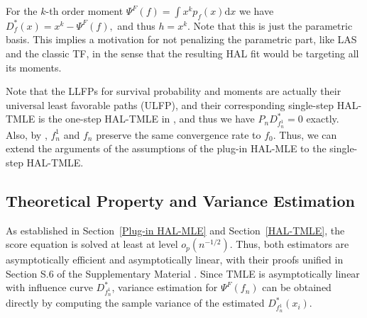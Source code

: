 \begin{example}
For the $k$-th order moment $\Psi^F(f)=\int x^k p_f(x)\mathrm{d}x$ we have
\(D^*_f(x) = x^k - \Psi^F(f),\) and thus $h = x^k$. Note that this is just the parametric basis. This implies a motivation for not penalizing the parametric part, like LAS and the classic TF, in the sense that the resulting HAL fit would be targeting all its moments.
\end{example}
Note that the LLFPs for survival probability and moments are actually their universal least favorable paths (ULFP), and their corresponding single-step HAL-TMLE is the one-step HAL-TMLE in \citet{van2017generally, van2016one, van2018targeted}, and thus we have $P_n D^*_{f_n^1} = 0$ exactly. Also, by \citet{van2017generally}, $f_n^1$ and $f_n$ preserve the same convergence rate to $f_0$. Thus, we can extend the arguments of the assumptions of the plug-in HAL-MLE to the single-step HAL-TMLE. 

\subsection{Theoretical Property and Variance Estimation}
\label{subsec: EIC-based-variance-estimation}
As established in Section~\ref{Plug-in HAL-MLE} and Section~\ref{HAL-TMLE}, the score equation is solved at least at level $o_p(n^{-1/2})$. Thus, both estimators are asymptotically efficient and asymptotically linear, with their proofs unified in Section S.6 of the Supplementary Material \citep{hou2026supplement}. Since TMLE is asymptotically linear with influence curve $D^*_{f_n^1}$, variance estimation for $\Psi^F(f_n)$ can be obtained directly by computing the sample variance of the estimated $D^*_{f_n^1}(x_i)$.